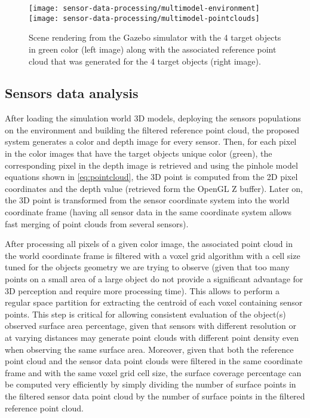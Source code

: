 \begin{figure}
	\centering
	\texttt{[image: sensor-data-processing/multimodel-environment]}\hspace{1em}
	\texttt{[image: sensor-data-processing/multimodel-pointclouds]}
	\caption{Scene rendering from the Gazebo simulator with the 4 target objects in green color (left image) along with the associated reference point cloud that was generated for the 4 target objects (right image).}
	\label{fig:reference-cloud}
\end{figure}


\subsection{Sensors data analysis}

After loading the simulation world 3D models, deploying the sensors populations on the environment and building the filtered reference point cloud, the proposed system generates a color and depth image for every sensor. Then, for each pixel in the color images that have the target objects unique color (green), the corresponding pixel in the depth image is retrieved and using the pinhole model equations shown in \cref{eq:pointcloud}, the 3D point is computed from the 2D pixel coordinates and the depth value (retrieved form the OpenGL Z buffer). Later on, the 3D point is transformed from the sensor coordinate system into the world coordinate frame (having all sensor data in the same coordinate system allows fast merging of point clouds from several sensors).

After processing all pixels of a given color image, the associated point cloud in the world coordinate frame is filtered with a voxel grid algorithm with a cell size tuned for the objects geometry we are trying to observe (given that too many points on a small area of a large object do not provide a significant advantage for 3D perception and require more processing time). This allows to perform a regular space partition for extracting the centroid of each voxel containing sensor points. This step is critical for allowing consistent evaluation of the object(s) observed surface area percentage, given that sensors with different resolution or at varying distances may generate point clouds with different point density even when observing the same surface area. Moreover, given that both the reference point cloud and the sensor data point clouds were filtered in the same coordinate frame and with the same voxel grid cell size, the surface coverage percentage can be computed very efficiently by simply dividing the number of surface points in the filtered sensor data point cloud by the number of surface points in the filtered reference point cloud.

